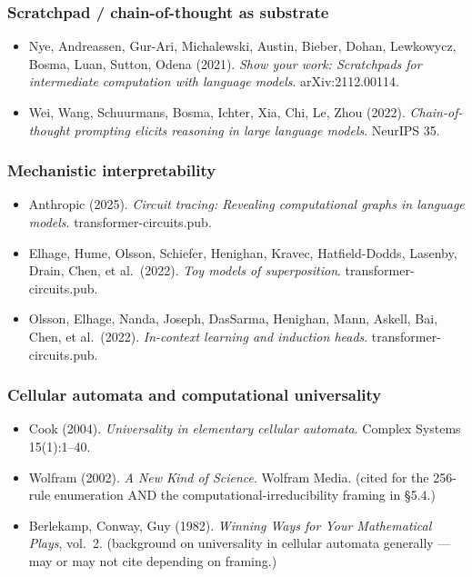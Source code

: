 \documentclass[twocolumn,switch,10pt]{article}
\providecommand{\tightlist}{\setlength{\itemsep}{0pt}\setlength{\parskip}{0pt}}
\begin{document}
\subsubsection{Scratchpad / chain-of-thought as substrate}\label{scratchpad-chain-of-thought-as-substrate}

\begin{itemize}
\tightlist
\item
  Nye, Andreassen, Gur-Ari, Michalewski, Austin, Bieber, Dohan,
  Lewkowycz, Bosma, Luan, Sutton, Odena (2021). \emph{Show your work:
  Scratchpads for intermediate computation with language models}.
  arXiv:2112.00114.
\item
  Wei, Wang, Schuurmans, Bosma, Ichter, Xia, Chi, Le, Zhou (2022).
  \emph{Chain-of-thought prompting elicits reasoning in large language
  models}. NeurIPS 35.
\end{itemize}

\subsubsection{Mechanistic interpretability}\label{mechanistic-interpretability}

\begin{itemize}
\tightlist
\item
  Anthropic (2025). \emph{Circuit tracing: Revealing computational graphs
  in language models}. transformer-circuits.pub.
\item
  Elhage, Hume, Olsson, Schiefer, Henighan, Kravec, Hatfield-Dodds,
  Lasenby, Drain, Chen, et al.~(2022). \emph{Toy models of superposition}.
  transformer-circuits.pub.
\item
  Olsson, Elhage, Nanda, Joseph, DasSarma, Henighan, Mann, Askell,
  Bai, Chen, et al.~(2022). \emph{In-context learning and induction
  heads}. transformer-circuits.pub.
\end{itemize}

\subsubsection{Cellular automata and computational universality}\label{cellular-automata-and-computational-universality}

\begin{itemize}
\tightlist
\item
  Cook (2004). \emph{Universality in elementary cellular automata}.
  Complex Systems 15(1):1--40.
\item
  Wolfram (2002). \emph{A New Kind of Science}. Wolfram Media. (cited for
  the 256-rule enumeration AND the computational-irreducibility
  framing in §5.4.)
\item
  Berlekamp, Conway, Guy (1982). \emph{Winning Ways for Your Mathematical
  Plays}, vol.~2. (background on universality in cellular automata
  generally --- may or may not cite depending on framing.)
\end{itemize}
\end{document}
